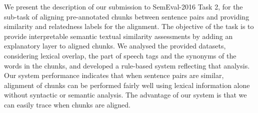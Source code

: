 We present the description of our submission to SemEval-2016 Task 2, for the sub-task of aligning pre-annotated chunks between sentence pairs and providing similarity and relatedness labels for the alignment.  The objective of the task is to provide interpretable semantic textual similarity assessments by adding an explanatory layer to aligned chunks. We analysed the provided datasets, considering lexical overlap, the part of speech tags and the synonyms of the words in the chunks, and developed a rule-based system reflecting that analysis.  Our system performance indicates that when sentence pairs are similar, alignment of chunks can be performed fairly well using lexical information alone without syntactic or semantic analysis.  The advantage of our system is that we can easily trace when chunks are aligned.

